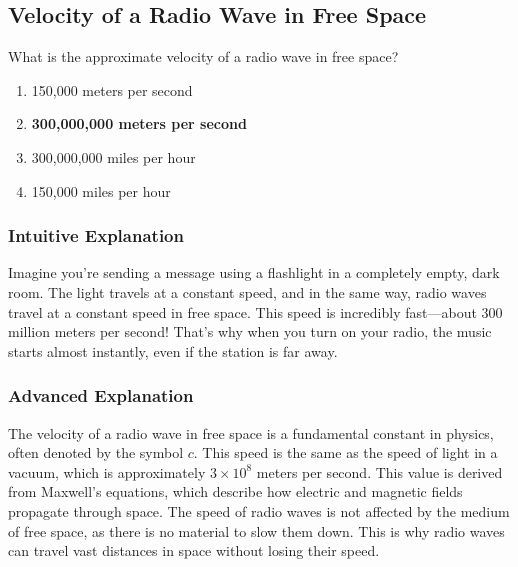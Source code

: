 \subsection{Velocity of a Radio Wave in Free Space}
\label{T3B11}

\begin{tcolorbox}[colback=gray!10!white,colframe=black!75!black,title=T3B11]
What is the approximate velocity of a radio wave in free space?
\begin{enumerate}[noitemsep]
    \item 150,000 meters per second
    \item \textbf{300,000,000 meters per second}
    \item 300,000,000 miles per hour
    \item 150,000 miles per hour
\end{enumerate}
\end{tcolorbox}

\subsubsection*{Intuitive Explanation}
Imagine you're sending a message using a flashlight in a completely empty, dark room. The light travels at a constant speed, and in the same way, radio waves travel at a constant speed in free space. This speed is incredibly fast—about 300 million meters per second! That's why when you turn on your radio, the music starts almost instantly, even if the station is far away.

\subsubsection*{Advanced Explanation}
The velocity of a radio wave in free space is a fundamental constant in physics, often denoted by the symbol \( c \). This speed is the same as the speed of light in a vacuum, which is approximately \( 3 \times 10^8 \) meters per second. This value is derived from Maxwell's equations, which describe how electric and magnetic fields propagate through space. The speed of radio waves is not affected by the medium of free space, as there is no material to slow them down. This is why radio waves can travel vast distances in space without losing their speed.

